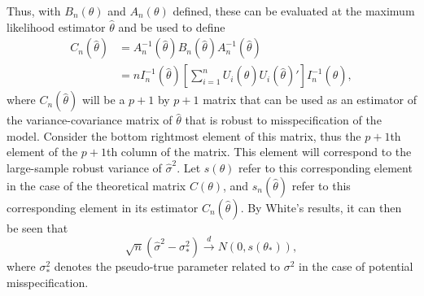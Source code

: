 		Thus, with $B_n(\theta)$ and $A_n(\theta)$ defined, these can be evaluated at the maximum likelihood estimator $\hat{\theta}$ and be used to define
		\begin{equation}
			\begin{split}
				C_n(\hat{\theta}) & = A^{-1}_n(\hat{\theta}) B_n(\hat{\theta}) A^{-1}_n(\hat{\theta}) \\
				& = n I_n^{-1}(\hat{\theta}) [\sum_{i=1}^{n} U_i(\hat{\theta}) U_i(\hat{\theta})'] I_n^{-1}(\hat{\theta}) ,
			\end{split}
		\end{equation}
		where $C_n(\hat{\theta})$ will be a $p+1$ by $p+1$ matrix that can be used as an estimator of the variance-covariance matrix of $\hat{\theta}$ that is robust to misspecification
		of the model. Consider the bottom rightmost element of this matrix, thus the $p+1$th element of the $p+1$th column of the matrix. This element will correspond to the large-sample
		robust variance of $\hat{\sigma}^2$. Let $s(\theta)$ refer to this corresponding element in the case of the theoretical matrix $C(\theta)$, and $s_n(\hat{\theta})$ refer to this
		corresponding element in its estimator $C_n(\hat{\theta})$. By White's results, it can then be seen that
		\begin{equation}
			\sqrt{n} (\hat{\sigma}^2 - \sigma_*^2) \xrightarrow[]{d} N(0, s(\theta_*)) ,
		\end{equation}
		where $\sigma_*^2$ denotes the pseudo-true parameter related to $\sigma^2$ in the case of potential misspecification.

